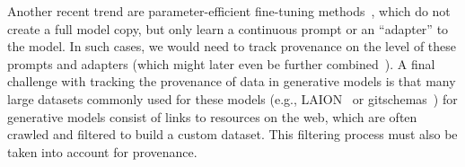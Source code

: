 Another recent trend are parameter-efficient fine-tuning methods~\cite{hu2021lora,li2021prefix,liu2023gpt,lester2021power}, which do not create a full model copy, but only learn a continuous prompt or an ``adapter'' to the model. In such cases, we would need to track provenance on the level of these prompts and adapters (which might later even be further combined~\cite{shah2023ziplora}). A final challenge with tracking the provenance of data in generative models is that many large datasets commonly used for these models (e.g., LAION~\cite{schuhmann2022laion} or gitschemas~\cite{dohmen2022gitschemas}) for generative models consist of links to resources on the web, which are often crawled and filtered to build a custom dataset. This filtering process must also be taken into account for provenance.


